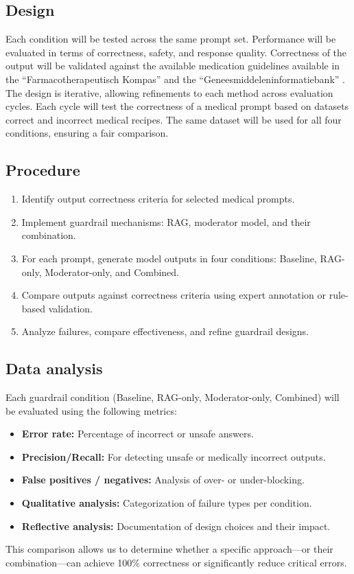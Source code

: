 \subsection{Design}

Each condition will be tested across the same prompt set.
Performance will be evaluated in terms of correctness, safety, and response quality.
Correctness of the output will be validated against the available medication guidelines available in the ``Farmacotherapeutisch Kompas'' \citep{farmacotherapeutischkompas} and the ``Geneesmiddeleninformatiebank'' \citep{geneesmiddeleninformatiebank}.
The design is iterative, allowing refinements to each method across evaluation cycles.
Each cycle will test the correctness of a medical prompt based on datasets correct and incorrect medical recipes.
The same dataset will be used for all four conditions, ensuring a fair comparison.

\subsection{Procedure}

\begin{enumerate}
    \item Identify output correctness criteria for selected medical prompts.
    \item Implement guardrail mechanisms: RAG, moderator model, and their combination.
    \item For each prompt, generate model outputs in four conditions: Baseline, RAG-only, Moderator-only, and Combined.
    \item Compare outputs against correctness criteria using expert annotation or rule-based validation.
    \item Analyze failures, compare effectiveness, and refine guardrail designs.
\end{enumerate}

\subsection{Data analysis}

Each guardrail condition (Baseline, RAG-only, Moderator-only, Combined) will be evaluated using the following metrics:

\begin{itemize}
    \item \textbf{Error rate:} Percentage of incorrect or unsafe answers.
    \item \textbf{Precision/Recall:} For detecting unsafe or medically incorrect outputs.
    \item \textbf{False positives / negatives:} Analysis of over- or under-blocking.
    \item \textbf{Qualitative analysis:} Categorization of failure types per condition.
    \item \textbf{Reflective analysis:} Documentation of design choices and their impact.
\end{itemize}

This comparison allows us to determine whether a specific approach—or their combination—can achieve 100\% correctness or significantly reduce critical errors.

